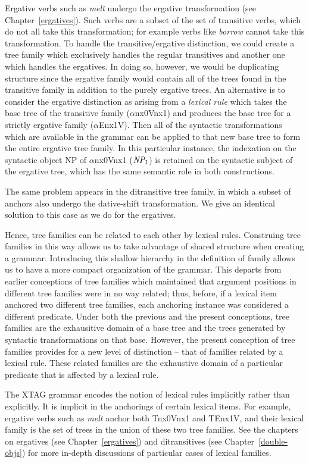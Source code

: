 Ergative verbs such as {\it melt} undergo the ergative transformation (see
Chapter~\ref{ergatives}). Such verbs are a subset of the set of transitive
verbs, which do not all take this transformation; for example verbs like {\it
borrow} cannot take this transformation. To handle the transitive/ergative
distinction, we could create a tree family which exclusively handles the
regular transitives and another one which handles the ergatives.  In doing so,
however, we would be duplicating structure since the ergative family would
contain all of the trees found in the transitive family in addition to the
purely ergative trees.  An alternative is to consider the ergative distinction
as arising from a {\em lexical rule} which takes the base tree of the
transitive family ($\alpha$nx0Vnx1) and produces the base tree for a strictly
ergative family ($\alpha$Enx1V).  Then all of the syntactic transformations
which are available in the grammar can be applied to that new base tree to form
the entire ergative tree family.  In this particular instance, the indexation
on the syntactic object NP of $\alpha$nx0Vnx1 ($\mbox{\em NP}_1$) is retained
on the syntactic subject of the ergative tree, which has the same semantic role
in both constructions.

The same problem appears in the ditransitive tree family, in which a subset of
anchors also undergo the dative-shift transformation. We give an identical
solution to this case as we do for the ergatives.

Hence, tree families can be related to each other by lexical rules.
Construing tree families in this way allows us to take advantage of
shared structure when creating a grammar. Introducing this shallow
hierarchy in the definition of family allows us to have a more compact
organization of the grammar. This departs from earlier conceptions of
tree families which maintained that argument positions in different
tree families were in no way related; thus, before, if a lexical item
anchored two different tree families, each anchoring instance was
considered a different predicate.  Under both the previous and the
present conceptions, tree families are the exhausitive domain of a
base tree and the trees generated by syntactic transformations on that
base.  However, the present conception of tree families provides for a
new level of distinction -- that of families related by a lexical
rule. These related families are the exhaustive domain of a particular
predicate that is affected by a lexical rule.

The XTAG grammar encodes the notion of lexical rules implicitly rather
than explicitly. It is implicit in the anchorings of certain lexical
items.  For example, ergative verbs such as {\it melt} anchor both
Tnx0Vnx1 and TEnx1V, and their lexical family is the set of trees in
the union of these two tree families.  See the chapters on ergatives
(see Chapter~\ref{ergatives}) and ditransitives (see
Chapter~\ref{double-objs}) for more in-depth discussions of particular
cases of lexical families.

